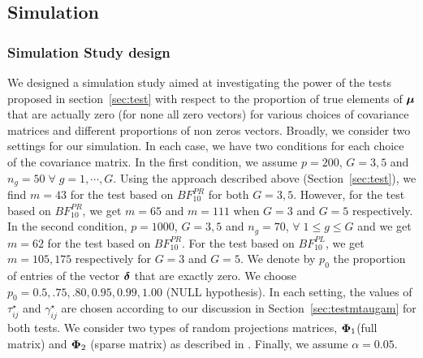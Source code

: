 \documentclass[times,sort&compress,3p]{elsarticle}
\theoremstyle{plain}%
\theoremstyle{definition}
\newcommand{\udelta}            {\mbox{\boldmath$\delta$}}
\newcommand{\umu}               {\mbox{\boldmath$\mu$}}
\newcommand{\uPhi}              {\mbox{\boldmath$\Phi$}}
\begin{document}
\subsection{Simulation}

\subsubsection{Simulation Study design}
We designed a simulation study aimed at investigating the power of the tests proposed in section~\ref{sec:test}
with respect to the proportion of true elements of $\umu$ that are actually zero (for none all zero vectors) for various choices of covariance matrices and different proportions of non zeros vectors.
Broadly, we consider two settings for our simulation. In each case, we have two conditions for each choice of the covariance matrix. 
In the first condition, we assume $p = 200$, $G=3, 5$ and $n_g = 50\;\forall\; g =  1, \cdots, G$. Using the approach described above (Section~\ref{sec:test}), we find $m = 43$ for the test based on $BF^{PR}_{10}$ for both $G=3,5$. However, for the test based on $BF_{10}^{PR}$, we get $m = 65$ and $m = 111$ when $G=3$ and $G=5$ respectively. 
In the second condition, $p = 1000$, $G=3, 5$ and $n_g = 70$, $\forall\; 1 \leq g \leq G$ and we get $m = 62$ for the test based on $BF^{PR}_{10}$. For the test based on $BF^{PL}_{10}$, we get $m = 105, 175$ respectively for $G=3$ and $G=5$. We denote by $p_0$ the proportion of entries of the vector $\udelta$ that are exactly zero. We choose $p_0 = 0.5, .75, .80, 0.95, 0.99, 1.00$ (NULL hypothesis).
In each setting, the values of $\tau^{\star}_{ij}$ and $\gamma^{\star}_{ij}$ are chosen according to our discussion in Section~\ref{sec:testmtaugam} for both tests. We consider two types of random projections matrices, $\uPhi_{1}$(full matrix)  and $\uPhi_2$ (sparse matrix) as described in \citealp{srivastava2014raptt,zoh2018powerful}. Finally, we assume $\alpha = 0.05$.
\end{document}
